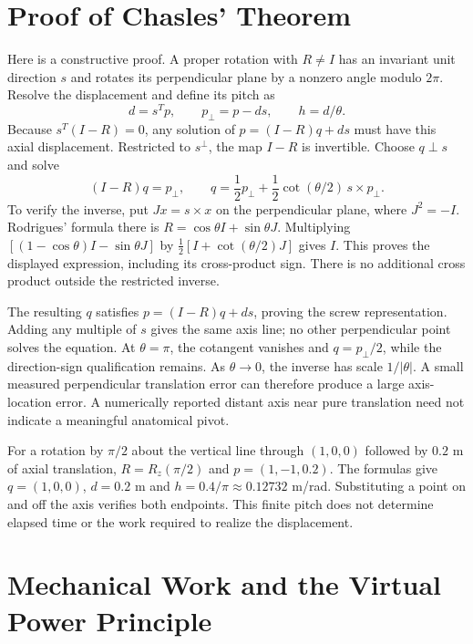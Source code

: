 \section{Proof of Chasles' Theorem}
\label{sec:chasles_proof}
\label{laymans:chasles_one_sentence}
\label{thm:chasles_formal}

Here is a constructive proof. A proper rotation with $R\ne I$ has an invariant unit direction $s$ and rotates its perpendicular plane by a nonzero angle modulo $2\pi$. Resolve the displacement and define its pitch as
\begin{equation}
 d=s^Tp,\qquad p_\perp=p-ds,\qquad h=d/\theta.
\end{equation}
\label{eq:chasles_pitch}
Because $s^T(I-R)=0$, any solution of $p=(I-R)q+ds$ must have this axial displacement. Restricted to $s^\perp$, the map $I-R$ is invertible. Choose $q\perp s$ and solve
\begin{equation}
 (I-R)q=p_\perp,\qquad
 q=\frac12p_\perp+\frac12\cot(\theta/2)\,s\times p_\perp.
\end{equation}
\label{eq:chasles_axis_point}
To verify the inverse, put $Jx=s\times x$ on the perpendicular plane, where $J^2=-I$. Rodrigues' formula there is $R=\cos\theta I+\sin\theta J$. Multiplying $[(1-\cos\theta)I-\sin\theta J]$ by $\tfrac12[I+\cot(\theta/2)J]$ gives $I$. This proves the displayed expression, including its cross-product sign. There is no additional cross product outside the restricted inverse.

The resulting $q$ satisfies $p=(I-R)q+ds$, proving the screw representation. Adding any multiple of $s$ gives the same axis line; no other perpendicular point solves the equation. At $\theta=\pi$, the cotangent vanishes and $q=p_\perp/2$, while the direction-sign qualification remains. As $\theta\to0$, the inverse has scale $1/|\theta|$. A small measured perpendicular translation error can therefore produce a large axis-location error. A numerically reported distant axis near pure translation need not indicate a meaningful anatomical pivot.

For a rotation by $\pi/2$ about the vertical line through $(1,0,0)$ followed by $0.2$ m of axial translation, $R=R_z(\pi/2)$ and $p=(1,-1,0.2)$. The formulas give $q=(1,0,0)$, $d=0.2$ m and $h=0.4/\pi\approx0.12732$ m/rad. Substituting a point on and off the axis verifies both endpoints. This finite pitch does not determine elapsed time or the work required to realize the displacement.

\section{Mechanical Work and the Virtual Power Principle}
\label{sec:virtual_power}
\label{princ:virtual_work}

